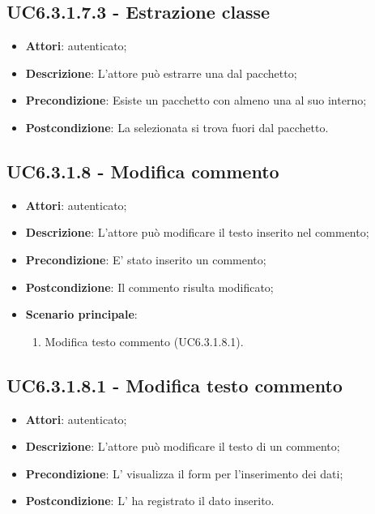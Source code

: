 \subsection{UC6.3.1.7.3 - Estrazione classe}
\label{ssec:UC6.3.1.7.3}
\begin{itemize}
\item \textbf{Attori}:  autenticato;
\item \textbf{Descrizione}: L'attore può estrarre una  dal pacchetto;
\item \textbf{Precondizione}: Esiste un pacchetto con almeno una  al suo interno;
\item \textbf{Postcondizione}: La  selezionata si trova fuori dal pacchetto.
\end{itemize}
\subsection{UC6.3.1.8 - Modifica commento}
\label{ssec:UC6.3.1.8}
\begin{itemize}
\item \textbf{Attori}:  autenticato;
\item \textbf{Descrizione}: L'attore può modificare il testo inserito nel commento;
\item \textbf{Precondizione}: E' stato inserito un commento;
\item \textbf{Postcondizione}: Il commento risulta modificato;
\item \textbf{Scenario principale}: \begin{enumerate}\item Modifica testo commento (UC6.3.1.8.1).
 \end{enumerate}
\end{itemize}
\subsection{UC6.3.1.8.1 - Modifica testo commento}
\label{ssec:UC6.3.1.8.1}
\begin{itemize}
\item \textbf{Attori}:  autenticato;
\item \textbf{Descrizione}: L'attore può modificare il testo di un commento;
\item \textbf{Precondizione}: L' visualizza il form per l'inserimento dei dati;
\item \textbf{Postcondizione}: L' ha registrato il dato inserito.
\end{itemize}
